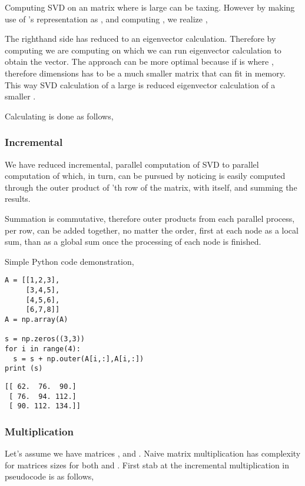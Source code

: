 \documentclass{article}
\begin{document}
Computing SVD on an  matrix where  is large can be
taxing. However by making use of 's representation as , and
computing , we realize \cite{zadeh},



The righthand side has reduced to an eigenvector calculation. Therefore by
computing  we are computing  on which we can run
eigenvector calculation to obtain the  vector. The approach can be more
optimal because if  is  where , therefore 
dimensions has to be  a much smaller matrix that can fit in memory.
This way SVD calculation of a large  is reduced eigenvector calculation of a
smaller .

Calculating  is done as follows,



\subsubsection{Incremental }

We have reduced incremental, parallel computation of SVD to parallel computation
of  which, in turn, can be pursued by noticing  is easily computed
through the outer product of 'th row of the matrix,  with itself, and
summing the results.



Summation is commutative, therefore outer products from each parallel process,
per row, can be added together, no matter the order, first at each node as a
local sum, than as a global sum once the processing of each node is finished.

Simple Python code demonstration,

\begin{verbatim}
A = [[1,2,3],
     [3,4,5],
     [4,5,6],
     [6,7,8]]
A = np.array(A)

s = np.zeros((3,3))
for i in range(4):
  s = s + np.outer(A[i,:],A[i,:])
print (s)    
\end{verbatim}

\begin{verbatim}
[[ 62.  76.  90.]
 [ 76.  94. 112.]
 [ 90. 112. 134.]]
\end{verbatim}

\subsubsection{Multiplication}

Let's assume we have matrices , and . Naive matrix multiplication has
 complexity for  matrices sizes for both  and . First
stab at the incremental multiplication in pseudocode is as follows,
\end{document}
